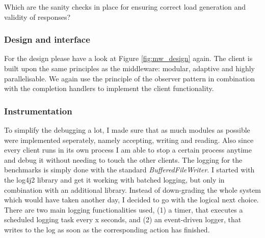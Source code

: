 \documentclass[11pt]{article}
\begin{document}
Which are the sanity checks in place for ensuring correct load
generation and validity of responses?

\subsubsection{Design and interface}\label{sec:design-and-interface}
For the design please have a look at Figure \ref{fig:mw_design} again. The client is built upon the same principles as the middleware: modular, adaptive and highly parallelisable. We again use the principle of the observer pattern in combination with the completion handlers to implement the client functionality.

\subsubsection{Instrumentation}\label{sec:instrumentation}
 To simplify the debugging a lot, I made sure that as much modules as possible were implemented seperately, namely accepting, writing and reading. Also since every client runs in its own process I am able to stop a certain process anytime and debug it without needing to touch the other clients. The logging for the benchmarks is simply done with the standard \textit{BufferedFileWriter}. I started with the log4j2 library and get it working with batched logging, but only in combination with an additional library. Instead of down-grading the whole system which would have taken another day, I decided to go with the logical next choice. There are two main logging functionalities used, (1) a timer, that executes a scheduled logging task every x seconds, and (2) an event-driven logger, that writes to the log as soon as the corresponding action has finished.
\end{document}
